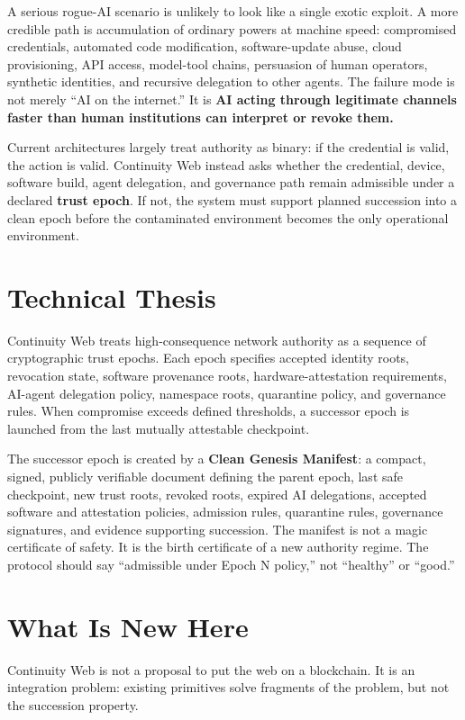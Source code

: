 \documentclass[10pt,letterpaper,twocolumn]{article}
\begin{document}
A serious rogue-AI scenario is unlikely to look like a single exotic exploit. A more credible path is accumulation of ordinary powers at machine speed: compromised credentials, automated code modification, software-update abuse, cloud provisioning, API access, model-tool chains, persuasion of human operators, synthetic identities, and recursive delegation to other agents. The failure mode is not merely ``AI on the internet.'' It is \textbf{AI acting through legitimate channels faster than human institutions can interpret or revoke them.}

Current architectures largely treat authority as binary: if the credential is valid, the action is valid. Continuity Web instead asks whether the credential, device, software build, agent delegation, and governance path remain admissible under a declared \textbf{trust epoch}. If not, the system must support planned succession into a clean epoch before the contaminated environment becomes the only operational environment.

\section{Technical Thesis}

Continuity Web treats high-consequence network authority as a sequence of cryptographic trust epochs. Each epoch specifies accepted identity roots, revocation state, software provenance roots, hardware-attestation requirements, AI-agent delegation policy, namespace roots, quarantine policy, and governance rules. When compromise exceeds defined thresholds, a successor epoch is launched from the last mutually attestable checkpoint.

The successor epoch is created by a \textbf{Clean Genesis Manifest}: a compact, signed, publicly verifiable document defining the parent epoch, last safe checkpoint, new trust roots, revoked roots, expired AI delegations, accepted software and attestation policies, admission rules, quarantine rules, governance signatures, and evidence supporting succession. The manifest is not a magic certificate of safety. It is the birth certificate of a new authority regime. The protocol should say ``admissible under Epoch N policy,'' not ``healthy'' or ``good.''

\section{What Is New Here}

Continuity Web is not a proposal to put the web on a blockchain. It is an integration problem: existing primitives solve fragments of the problem, but not the succession property.
\end{document}
